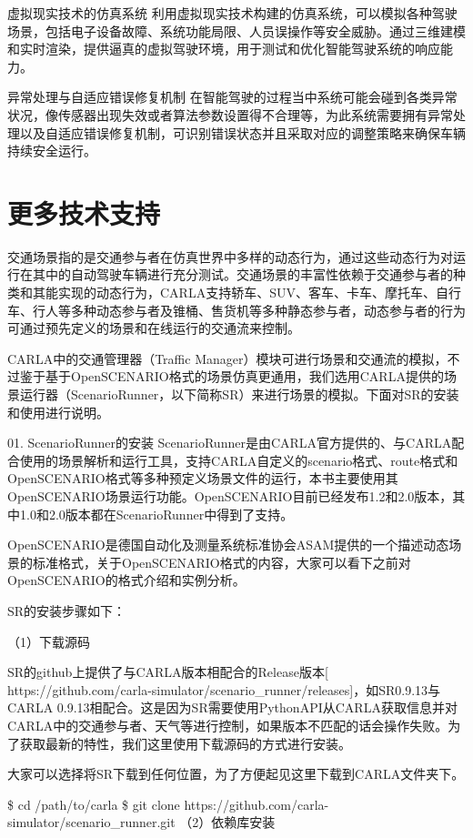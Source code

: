 虚拟现实技术的仿真系统
利用虚拟现实技术构建的仿真系统，可以模拟各种驾驶场景，包括电子设备故障、系统功能局限、人员误操作等安全威胁。​通过三维建模和实时渲染，提供逼真的虚拟驾驶环境，用于测试和优化智能驾驶系统的响应能力。 ​

异常处理与自适应错误修复机制
在智能驾驶的过程当中系统可能会碰到各类异常状况，像传感器出现失效或者算法参数设置得不合理等，为此系统需要拥有异常处理以及自适应错误修复机制，可识别错误状态并且采取对应的调整策略来确保车辆持续安全运行\cite{朱西产2019安全切入场景下的驾驶人初始制动时刻分析}。



\section{更多技术支持}
交通场景指的是交通参与者在仿真世界中多样的动态行为，通过这些动态行为对运行在其中的自动驾驶车辆进行充分测试。交通场景的丰富性依赖于交通参与者的种类和其能实现的动态行为，CARLA支持轿车、SUV、客车、卡车、摩托车、自行车、行人等多种动态参与者及锥桶、售货机等多种静态参与者，动态参与者的行为可通过预先定义的场景和在线运行的交通流来控制。

CARLA中的交通管理器（Traffic Manager）模块可进行场景和交通流的模拟，不过鉴于基于OpenSCENARIO格式的场景仿真更通用，我们选用CARLA提供的场景运行器（ScenarioRunner，以下简称SR）来进行场景的模拟。下面对SR的安装和使用进行说明。

01. ScenarioRunner的安装
ScenarioRunner是由CARLA官方提供的、与CARLA配合使用的场景解析和运行工具，支持CARLA自定义的scenario格式、route格式和OpenSCENARIO格式等多种预定义场景文件的运行，本书主要使用其OpenSCENARIO场景运行功能。OpenSCENARIO目前已经发布1.2和2.0版本，其中1.0和2.0版本都在ScenarioRunner中得到了支持。

OpenSCENARIO是德国自动化及测量系统标准协会ASAM提供的一个描述动态场景的标准格式，关于OpenSCENARIO格式的内容，大家可以看下之前对OpenSCENARIO的格式介绍和实例分析。

SR的安装步骤如下：

（1）下载源码

SR的github上提供了与CARLA版本相配合的Release版本[ https://github.com/carla-simulator/scenario\_runner/releases]，如SR0.9.13与CARLA 0.9.13相配合。这是因为SR需要使用PythonAPI从CARLA获取信息并对CARLA中的交通参与者、天气等进行控制，如果版本不匹配的话会操作失败。为了获取最新的特性，我们这里使用下载源码的方式进行安装。

大家可以选择将SR下载到任何位置，为了方便起见这里下载到CARLA文件夹下。

\$ cd /path/to/carla
\$ git clone https://github.com/carla-simulator/scenario\_runner.git
（2）依赖库安装

